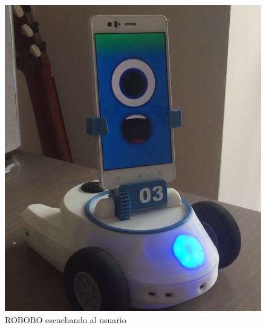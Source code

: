 \begin{figure}[h]
\centering
\begin{minipage}{0.45\textwidth}
\centering
\includegraphics[width=1\linewidth]{imagenes/simon_surprised.png}
\caption{ROBOBO escuchando al usuario}
\label{fig:simon-surprised}


\end{minipage}
\end{figure}
